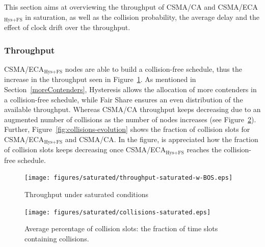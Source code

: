 \documentclass[a4paper,journal]{IEEEtran}
\begin{document}
	This section aims at overviewing the throughput of CSMA/CA and CSMA/ECA$_{\text{Hys+FS}}$  in saturation, as well as the collision probability, the average delay and the effect of clock drift over the throughput.
	\\
	\subsubsection{Throughput}
	CSMA/ECA$_{\text{Hys+FS}}$ nodes are able to build a collision-free schedule, thus the increase in the throughput seen in Figure~\ref{fig:throughput-sat}. As mentioned in Section~\ref{moreContenders}, Hysteresis allows the allocation of more contenders in a collision-free schedule, while Fair Share ensures an even distribution of the available throughput. Whereas CSMA/CA throughput keeps decreasing due to an augmented number of collisions as the number of nodes increases (see Figure~\ref{fig:collisions-sat}). Further, Figure~\ref{fig:collisions-evolution} shows the fraction of collision slots for CSMA/ECA$_{\text{Hys+FS}}$ and CSMA/CA. In the figure, is appreciated how the fraction of collision slots keeps decreasing once CSMA/ECA$_{\text{Hys+FS}}$ reaches the collision-free schedule.
	
	\begin{figure}[tb]
	\centering
		\texttt{[image: figures/saturated/throughput-saturated-w-BOS.eps]}
		\caption{Throughput under saturated conditions}
		\label{fig:throughput-sat}
	\end{figure}
	
	\begin{figure}[tb]
	\centering
		\texttt{[image: figures/saturated/collisions-saturated.eps]}
		\caption{Average percentage of collision slots: the fraction of time slots containing collisions.}
		\label{fig:collisions-sat}
	\end{figure}
	
\end{document}
